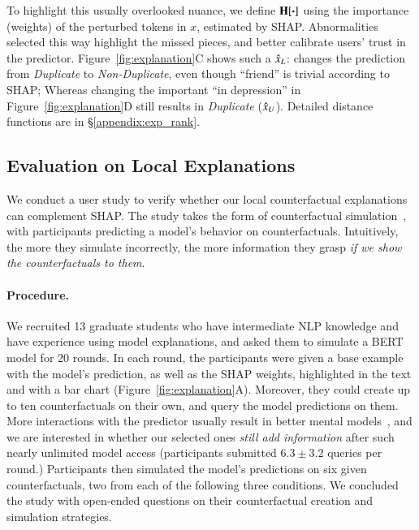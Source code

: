 To highlight this usually overlooked nuance, we define $\operatorname*{\mathbf{H}}[\boldsymbol{\cdot}]$ using the importance (weights) of the perturbed tokens in $x$, estimated by SHAP.
Abnormalities selected this way highlight the missed pieces, and better calibrate users' trust in the predictor. 
Figure~\ref{fig:explanation}C shows such a $\hat{x}_L$:  changes the prediction from \emph{Duplicate} to \emph{Non-Duplicate}, even though ``friend'' is trivial according to SHAP; Whereas changing the important ``in depression'' in Figure~\ref{fig:explanation}D still results in \emph{Duplicate} ($\hat{x}_U$).
Detailed distance functions are in \S\ref{appendix:exp_rank}.



\subsection{Evaluation on Local Explanations}
\label{subsec:exp_user_study}

We conduct a user study to verify whether our local counterfactual explanations can complement SHAP.
The study takes the form of counterfactual simulation~\cite{hase2020evaluating}, with participants predicting a model's behavior on counterfactuals.
Intuitively, the more they simulate incorrectly, the more information they grasp \emph{if we show the counterfactuals to them}.

\paragraph{Procedure.}
We recruited 13 graduate students who have intermediate NLP knowledge and have experience using model explanations, and asked them to simulate a \qqp BERT model for 20 rounds.
In each round, the participants were given a base example with the model's prediction, as well as the SHAP weights, highlighted in the text and with a bar chart (Figure~\ref{fig:explanation}A).
Moreover, they could create up to ten counterfactuals on their own, and query the model predictions on them.
More interactions with the predictor usually result in better mental models~\cite{miller}, and we are interested in whether our selected ones \emph{still add information} after such nearly unlimited model access (participants submitted $6.3\pm3.2$ queries per round.)
Participants then simulated the model's predictions on six given counterfactuals, two from each of the following three conditions.
We concluded the study with open-ended questions on their counterfactual creation and simulation strategies.

